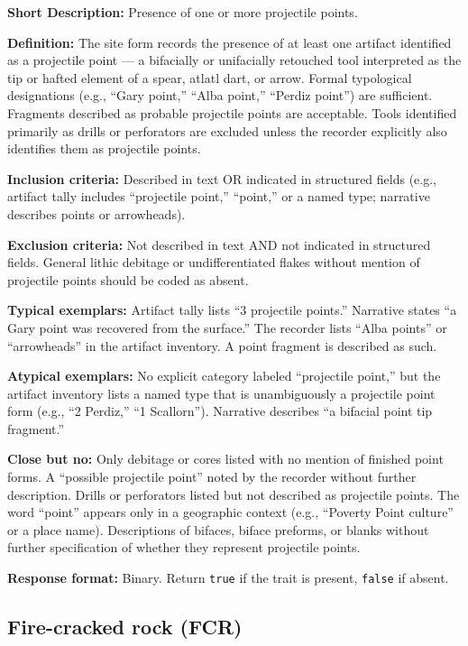 \documentclass[
]{article}
\begin{document}
\textbf{Short Description:} Presence of one or more projectile points.

\textbf{Definition:} The site form records the presence of at least one
artifact identified as a projectile point --- a bifacially or
unifacially retouched tool interpreted as the tip or hafted element of a
spear, atlatl dart, or arrow. Formal typological designations (e.g.,
``Gary point,'' ``Alba point,'' ``Perdiz point'') are sufficient.
Fragments described as probable projectile points are acceptable. Tools
identified primarily as drills or perforators are excluded unless the
recorder explicitly also identifies them as projectile points.

\textbf{Inclusion criteria:} Described in text OR indicated in
structured fields (e.g., artifact tally includes ``projectile point,''
``point,'' or a named type; narrative describes points or arrowheads).

\textbf{Exclusion criteria:} Not described in text AND not indicated in
structured fields. General lithic debitage or undifferentiated flakes
without mention of projectile points should be coded as absent.

\textbf{Typical exemplars:} Artifact tally lists ``3 projectile
points.'' Narrative states ``a Gary point was recovered from the
surface.'' The recorder lists ``Alba points'' or ``arrowheads'' in the
artifact inventory. A point fragment is described as such.

\textbf{Atypical exemplars:} No explicit category labeled ``projectile
point,'' but the artifact inventory lists a named type that is
unambiguously a projectile point form (e.g., ``2 Perdiz,'' ``1
Scallorn''). Narrative describes ``a bifacial point tip fragment.''

\textbf{Close but no:} Only debitage or cores listed with no mention of
finished point forms. A ``possible projectile point'' noted by the
recorder without further description. Drills or perforators listed but
not described as projectile points. The word ``point'' appears only in a
geographic context (e.g., ``Poverty Point culture'' or a place name).
Descriptions of bifaces, biface preforms, or blanks without further
specification of whether they represent projectile points.

\textbf{Response format:} Binary. Return \texttt{true} if the trait is
present, \texttt{false} if absent.

\subsection{Fire-cracked rock (FCR)}\label{fire-cracked-rock-fcr}
\end{document}
